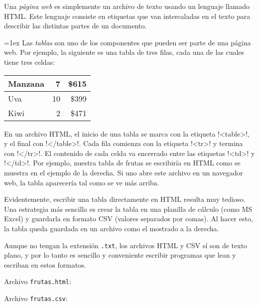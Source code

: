Una \emph{página web}
es simplemente un archivo de texto
usando un lenguaje llamado HTML\@.
Este lenguaje consiste en etiquetas
que van intercaladas en el texto
para describir las distintas partes de un documento.

\begin{minipage}[t]{0.7\textwidth}
  \parskip=1ex
  Las \emph{tablas} son uno de los componentes
  que pueden ser parte de una página web.
  Por ejemplo,
  la siguiente es una tabla de tres filas,
  cada una de las cuales tiene tres celdas:

  \vspace{1ex}
  \hfil
  \begin{tabular}{|l|r|r|}  \hline
    Manzana &  7 & \$615 \\ \hline
    Uva     & 10 & \$399 \\ \hline
    Kiwi    &  2 & \$471 \\ \hline
  \end{tabular}
  \vspace{1ex}
  \hfill

  \newcommand\lh{\li[language=html]}
  En un archivo HTML,
  el inicio de una tabla se marca con la etiqueta \lh!<table>!,
  y el final con \lh!</table>!.
  Cada fila comienza con la etiqueta \lh!<tr>!
  y termina con \lh!</tr>!.
  El contenido de cada celda va encerrado entre las etiquetas
  \lh!<td>! y \lh!</td>!.
  Por ejemplo,
  nuestra tabla de frutas se escribiría en HTML
  como se muestra en el ejemplo de la derecha.
  Si uno abre este archivo en un navegador web,
  la tabla aparecería tal como se ve más arriba.

  Evidentemente,
  escribir una tabla directamente en HTML resulta muy tedioso.
  Una estrategia más sencilla es crear la tabla en una planilla de cálculo
  (como MS Excel)
  y guardarla en formato CSV (valores separados por comas).
  Al hacer esto,
  la tabla queda guardada en un archivo como el mostrado a la derecha.

  Aunque no tengan la extensión \verb!.txt!,
  los archivos HTML y CSV sí son de texto plano,
  y por lo tanto es sencillo y conveniente escribir programas
  que lean y escriban en estos formatos.
\end{minipage}
\hfill
\begin{minipage}[t]{0.25\textwidth}
  Archivo \verb+frutas.html+:
  

  Archivo \verb+frutas.csv+:
  
\end{minipage}

